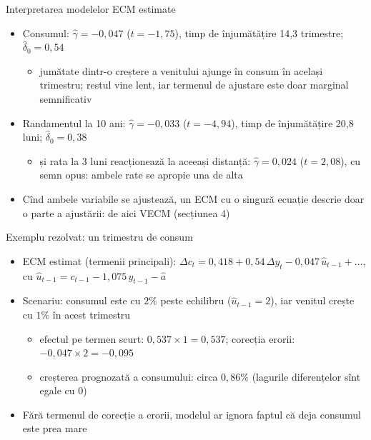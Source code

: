 \begin{frame}{Interpretarea modelelor ECM estimate}
\itemsize{\small}
\begin{itemize}
    \item Consumul: $\hat\gamma = -0{,}047$ ($t = -1{,}75$), timp de înjumătățire 14{,}3 trimestre; $\hat\delta_0 = 0{,}54$
    \begin{itemize}
        \item jumătate dintr-o creștere a venitului ajunge în consum în același trimestru; restul vine lent, iar termenul de ajustare este doar marginal semnificativ
    \end{itemize}
    \item Randamentul la 10 ani: $\hat\gamma = -0{,}033$ ($t = -4{,}94$), timp de înjumătățire 20{,}8 luni; $\hat\delta_0 = 0{,}38$
    \begin{itemize}
        \item și rata la 3 luni reacționează la aceeași distanță: $\hat\gamma = 0{,}024$ ($t = 2{,}08$), cu semn opus: ambele rate se apropie una de alta
    \end{itemize}
    \item Cînd ambele variabile se ajustează, un ECM cu o singură ecuație descrie doar o parte a ajustării: de aici VECM (secțiunea 4)
\end{itemize}
\end{frame}

\begin{frame}{Exemplu rezolvat: un trimestru de consum}
\itemsize{\small}
\begin{itemize}
    \item ECM estimat (termenii principali): $\Delta c_t = 0{,}418 + 0{,}54\,\Delta y_t -0{,}047\,\hat u_{t-1} + \dots$, cu $\hat u_{t-1} = c_{t-1} - 1{,}075\,y_{t-1} - \hat a$
    \item Scenariu: consumul este cu $2\%$ peste echilibru ($\hat u_{t-1} = 2$), iar venitul crește cu $1\%$ în acest trimestru
    \begin{itemize}
        \item efectul pe termen scurt: $0{,}537 \times 1 = 0{,}537$; corecția erorii: $-0{,}047 \times 2 = -0{,}095$
        \item creșterea prognozată a consumului: circa $0{,}86\%$ (lagurile diferențelor sînt egale cu 0)
    \end{itemize}
    \item Fără termenul de corecție a erorii, modelul ar ignora faptul că deja consumul este prea mare
\end{itemize}
\end{frame}


